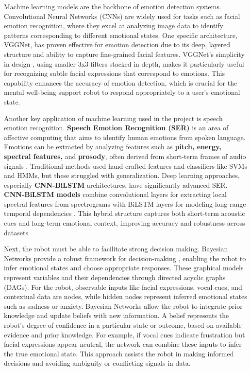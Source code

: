 Machine learning models are the backbone of emotion detection systems. Convolutional Neural Networks (CNNs) are widely used for tasks such as facial emotion recognition, where they excel at analyzing image data to identify patterns corresponding to different emotional states. One specific architecture, VGGNet, has proven effective for emotion detection due to its deep, layered structure and ability to capture fine-grained facial features. VGGNet's simplicity in design \cite{computation11030052}, using smaller 3x3 filters stacked in depth, makes it particularly useful for recognizing subtle facial expressions that correspond to emotions. This capability enhances the accuracy of emotion detection, which is crucial for the mental well-being support robot to respond appropriately to a user's emotional state.

Another key application of machine learning used in the project is speech emotion recognition. \textbf{Speech Emotion Recognition (SER)} is an area of affective computing that aims to identify human emotions from spoken language. Emotions can be extracted by analyzing features such as \textbf{pitch, energy, spectral features,} and \textbf{prosody}, often derived from short-term frames of audio signals \cite{wu2023empiricalstudyimprovementspeech}. Traditional methods used hand-crafted features and classifiers like SVMs and HMMs, but these struggled with generalization. Deep learning approaches, especially \textbf{CNN-BiLSTM} architectures, have significantly advanced SER. \textbf{CNN-BiLSTM models} combine convolutional layers for extracting local spectral features from spectrograms with BiLSTM layers for modeling long-range temporal dependencies \cite{kundu2024enhancedspeechemotionrecognition}. This hybrid structure captures both short-term acoustic cues and long-term emotional context, improving accuracy and robustness across datasets

Next, the robot must be able to facilitate strong decision making. Bayesian Networks provide a robust framework for decision-making \cite{DBLP:journals/corr/abs-2002-00269}, enabling the robot to infer emotional states and choose appropriate responses. These graphical models represent variables and their dependencies through directed acyclic graphs (DAGs). For the robot, observable inputs like facial expressions, vocal cues, and contextual data are nodes, while hidden nodes represent inferred emotional states such as sadness or anxiety. Bayesian Networks allow the robot to integrate prior knowledge and update beliefs with new information. A belief represents the robot’s degree of confidence in a particular state or outcome, based on available evidence and prior knowledge. For example, if vocal cues indicate frustration but facial expressions appear neutral, the network can combine these inputs to infer the true emotional state. This approach assists the robot in making informed decisions and avoiding ambiguity or conflicting signals in data. 